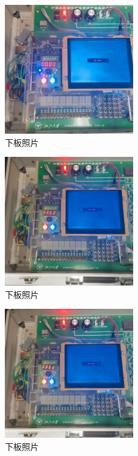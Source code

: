 \documentclass{article}
\begin{document}
    \begin{figure}[H]
    \centering
    \includegraphics[width=0.5\textwidth]{lab10p/9.jpg}
    \caption{\label{Lab10}下板照片}
    \end{figure}

    \begin{figure}[H]
    \centering
    \includegraphics[width=0.5\textwidth]{lab10p/10.jpg}
    \caption{\label{Lab10}下板照片}
    \end{figure} 
    
    \begin{figure}[H]
    \centering
    \includegraphics[width=0.5\textwidth]{lab10p/11.jpg}
    \caption{\label{Lab10}下板照片}
    \end{figure} 
\end{document}
